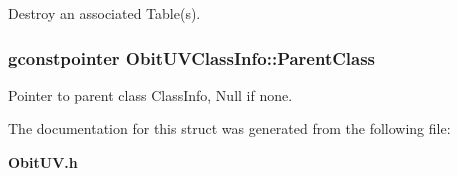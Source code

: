 Destroy an associated Table(s). 

\subsubsection{\setlength{\rightskip}{0pt plus 5cm}gconstpointer {\bf Obit\-UVClass\-Info::Parent\-Class}}\label{structObitUVClassInfo_o3}


Pointer to parent class Class\-Info, Null if none. 



The documentation for this struct was generated from the following file:\begin{CompactItemize}
\item 
{\bf Obit\-UV.h}\end{CompactItemize}
